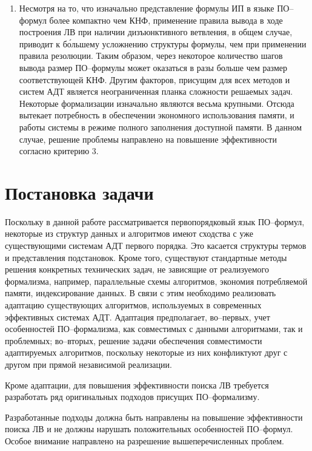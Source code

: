 \begin{enumerate}
\item Несмотря на то, что изначально представление формулы ИП в языке ПО--формул более компактно чем КНФ, применение правила вывода в ходе построения ЛВ при наличии дизъюнктивного ветвления, в общем случае, приводит к б\'{о}льшему усложнению структуры формулы, чем при применении правила резолюции. Таким образом, через некоторое количество шагов вывода размер ПО--формулы может оказаться в разы больше чем размер соответствующей КНФ. Другим факторов, присущим для всех методов и систем АДТ является неограниченная планка сложности решаемых задач. Некоторые формализации изначально являются весьма крупными. Отсюда вытекает потребность в обеспечении экономного использования памяти, и работы системы в режиме полного заполнения доступной памяти. В данном случае, решение проблемы направлено на повышение эффективности согласно критерию 3.
\end{enumerate}


\section{Постановка задачи}
Поскольку в данной работе рассматривается первопорядковый язык ПО--формул, некоторые из структур данных и алгоритмов имеют сходства с уже существующими системам АДТ первого порядка. Это касается структуры термов и представления подстановок. Кроме того, существуют стандартные методы решения конкретных технических задач, не зависящие от реализуемого формализма, например, параллельные схемы алгоритмов, экономия потребляемой памяти, индексирование данных. В связи с этим необходимо реализовать адаптацию существующих алгоритмов, используемых в современных эффективных системах АДТ. Адаптация предполагает, во--первых, учет особенностей ПО--формализма, как совместимых с данными алгоритмами, так и проблемных; во--вторых, решение задачи обеспечения совместимости адаптируемых алгоритмов, поскольку некоторые из них конфликтуют друг с другом при прямой независимой реализации.

Кроме адаптации, для повышения эффективности поиска ЛВ требуется разработать ряд оригинальных подходов присущих ПО--формализму.

Разработанные подходы должна быть направлены на повышение эффективности поиска ЛВ и не должны нарушать положительных особенностей ПО--формул. Особое внимание направлено на разрешение вышеперечисленных проблем.



